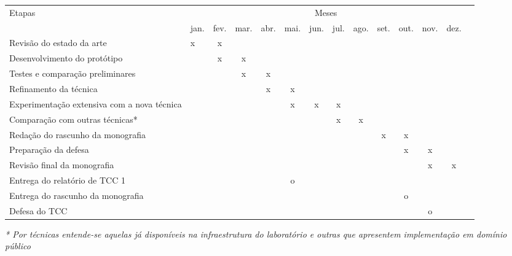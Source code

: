 \documentclass{ufsc-thesis} %
\begin{document}
{	
	\begin{tabular}{|X p{3cm}|c|c|c|c|c|c|c|c|c|c|c|c|}
		\hline
		\multirow{-1}{*}{Etapas} &
		\multicolumn{12}{|c|}{Meses} \\ \hhline{|~|*{12}{-|}}
		& jan. & fev. & mar. & abr. & mai. & jun. & jul. & ago. & set. & out. & nov. & dez. \\ \hline
		\hiderowcolors Revisão do estado da arte 												& x    & x	  &      &      &      &      &      &      &      &      &      &		\\ \hline
		\hiderowcolors Desenvolvimento do protótipo
		&      & x    & x    &      &      &      &      &      &      &      &      &      \\
		\hline
		\hiderowcolors Testes e comparação preliminares
		&  	   &      & x    & x    &      &      &      &      &      &      &      &		\\
		\hline
		\hiderowcolors Refinamento da técnica
		&      &      &      & x    & x    &      &      &      &      &      &      &		\\
		\hline
		\hiderowcolors Experimentação extensiva com a nova técnica
		&  	   &  	  &      &      & x    & x    & x    &      &      &      &      &		\\
		\hline
		\hiderowcolors Comparação com outras técnicas*
		&  	   &  	  &      &      &      &      & x    & x    &      &      &      &		\\
		\hline
		\hiderowcolors Redação do rascunho da monografia
		&  	   &  	  &      &      &      &      &      &      & x    & x    &      &		\\
		\hline
		\hiderowcolors Preparação da defesa
		&  	   &   	  &      &      &      &      &      &      &      & x    & x    &		\\
		\hline
		\hiderowcolors Revisão final da monografia
		&  	   &  	  &      &      &      &      &      &      &      &      & x    & x
		\\ \hline
		\hiderowcolors Entrega do relatório de TCC 1
		&  	   &  	  &      &      & o    &      &      &      &      &      &      &		\\
		\hline
		\hiderowcolors Entrega do rascunho da monografia
		&  	   &  	  &      &      &      &      &      &      &      & o    &      &		\\
		\hline
		\hiderowcolors Defesa do TCC
		&  	   &  	  &      &      &      &      &      &      &      &      & o    &		\\
		\hline
	\end{tabular}
}
\textit{* Por técnicas entende-se aquelas já disponíveis na infraestrutura do laboratório e outras que apresentem implementação em domínio público}
\end{document}
